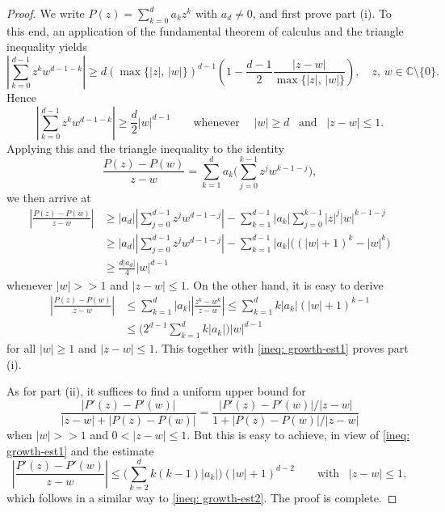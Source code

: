 \documentclass[10pt,a4paper]{amsart}
\begin{document}
\begin{proof} We write $P(z)=\sum_{k=0}^{d}a_kz^k$ with $a_d\neq 0$, and first prove part {\rm(i)}. To this end, an application of the fundamental theorem of calculus and the triangle inequality yields
  $$
  \left|\sum_{k=0}^{d-1} z^k w^{d-1-k} \right| \geq d \left( \max\{|z|,\, |w|\} \right)^{d-1} \left(1-\frac{d-1}{2} \frac{|z-w|} {\max\{|z|,\, |w|\}} \right),
  \quad z,\, w\in\mathbb C\!\setminus\!\{0\}.
  $$
Hence
  $$
  \left|\sum_{k=0}^{d-1} z^k w^{d-1-k} \right| \geq \frac{d}{2}|w|^{d-1}   \qquad \mbox{whenever} \quad \; |w|\geq d  \; \; \; \mbox{and}  \; \; \; |z-w|\leq 1.
  $$
Applying this and the triangle inequality to the identity
  $$
  \frac{P(z)-P(w)}{z-w} = \sum_{k=1}^{d} a_k\bigg(\sum_{j=0}^{k-1} z^j w^{k-1-j}\bigg),
  $$
we then arrive at
   \begin{equation}\label{ineq: growth-est1}
    \begin{split}
     \left|\frac{P(z)-P(w)}{z-w}\right| &\geq |a_d| \left|\sum_{j=0}^{d-1} z^j w^{d-1-j} \right| - \sum_{k=1}^{d-1} |a_k| \sum_{j=0}^{k-1} |z|^j |w|^{k-1-j}\\
     &\geq |a_d| \left|\sum_{j=0}^{d-1} z^j w^{d-1-j} \right| - \sum_{k=1}^{d-1} |a_k| \big( (|w|+1)^k-|w|^k \big) \\
     &\geq \frac{d|a_d|}{4}|w|^{d-1}
    \end{split}
   \end{equation}
whenever $|w|>>1$ and  $|z-w|\leq 1$. On the other hand, it is easy to derive
   \begin{equation}\label{ineq: growth-est2}
    \begin{split}
     \left|\frac{P(z)-P(w)}{z-w}\right|
      &\leq \sum_{k=1}^{d} |a_k| \left|\frac{z^k-w^k}{z-w}\right| \leq \sum_{k=1}^{d} k|a_k| (|w|+1)^{k-1} \\
      &\leq \bigg(2^{d-1}\sum_{k=1}^{d} k|a_k|\bigg) |w|^{d-1}
    \end{split}
   \end{equation}
for all $|w|\geq 1$ and $|z-w|\leq 1$. This together with \eqref{ineq: growth-est1} proves part {\rm(i)}.

\smallskip

  As for part {\rm(ii)}, it suffices to find a uniform upper bound for
    $$
    \frac{|P'(z)-P'(w)|}{|z-w|+|P(z)-P(w)|}=\frac{|P'(z)-P'(w)|/|z-w|}{1+|P(z)-P(w)|/|z-w|}
    $$
when $|w|>>1$ and $0<|z-w|\leq 1$. But this is easy to achieve, in view of \eqref{ineq: growth-est1} and the estimate
   $$
   \left|\frac{P'(z)-P'(w)}{z-w}\right| \leq \bigg(\sum_{k=2}^{d} k(k-1)|a_k|\bigg) (|w|+1)^{d-2}
   \qquad \mbox{with}  \; \; \; |z-w|\leq 1,
   $$
which follows in a similar way to \eqref{ineq: growth-est2}. The proof is complete.
\end{proof}
\end{document}
